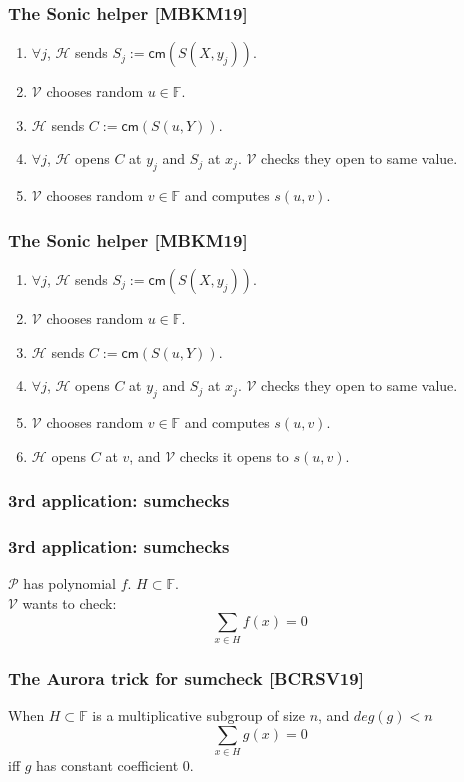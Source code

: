 \documentclass[shadesubsections,trans,14pt,mathserif]{beamer}
\newcommand{\F}{\ensuremath{\mathbb F}}
\newcommand{\cm}{\ensuremath{\mathsf{cm}}}
\newcommand{\defeq}{\ensuremath{:=}}
\newcommand{\helper}{\ensuremath{\mathcal{H}}}
\newcommand{\ver}{\ensuremath{\mathcal{V}}}
\newcommand{\prv}{\ensuremath{\mathcal{P}}}
\begin{document}
 \begin{frame}
  \frametitle{The Sonic helper \small{[MBKM19]}}
 \begin{enumerate}
  \item $\forall j$, $\helper$ sends $S_j \defeq \cm(S(X,y_j))$.
\item $\ver$ chooses random $u\in \F$.
\item $\helper$ sends $C\defeq \cm(S(u,Y))$.
\item $\forall j$, $\helper$ opens $C$ at $y_j$ and $S_j$ at $x_j$. $\ver$ checks they open to same value.
\item $\ver$ chooses random $v\in \F$ and computes $s(u,v)$.
\end{enumerate}
 \vspace{0.4in}
 \end{frame}

 
 
 \begin{frame}
\frametitle{The Sonic helper \small{[MBKM19]}}
 \begin{enumerate}
  \item $\forall j$, $\helper$ sends $S_j \defeq \cm(S(X,y_j))$.
\item $\ver$ chooses random $u\in \F$.
\item $\helper$ sends $C\defeq \cm(S(u,Y))$.
\item $\forall j$, $\helper$ opens $C$ at $y_j$ and $S_j$ at $x_j$. $\ver$ checks they open to same value.
\item $\ver$ chooses random $v\in \F$ and computes $s(u,v)$.
\item $\helper$ opens $C$ at $v$, and $\ver$ checks it opens to $s(u,v)$.
\end{enumerate}
 \vspace{0.4in}
 \end{frame}

  \begin{frame}
\frametitle{3rd application: sumchecks }
 \end{frame}
 
  \begin{frame}
\frametitle{3rd application: sumchecks}
$\prv$ has polynomial $f$. $H\subset \F$. \\
 \vspace{0.4in}
$\ver$ wants to check:
\[\sum_{x\in H} f(x) =0\]

\end{frame}


  \begin{frame}
\frametitle{The Aurora trick for sumcheck \small{[BCRSV19]}}
\begin{lemma}
 When $H\subset \F$ is a multiplicative subgroup of size $n$, and $deg(g)<n$
\[\sum_{x\in H} g(x) =0\]
iff $g$ has constant coefficient $0$.
\end{lemma}
 \vspace{0.4in}

\end{frame}
\end{document}
